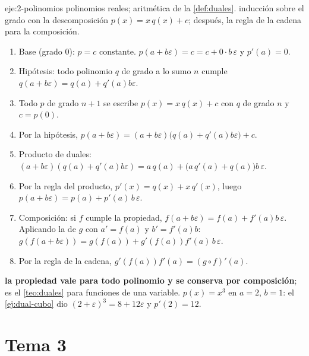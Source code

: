 \begin{solucion}{eje:2-polinomios}
\datos polinomios reales; aritmética de la \cref{def:duales}.
\planteamiento inducción sobre el grado con la descomposición $p(x)=x\,q(x)+c$; después, la regla de la cadena para la composición.
\pasos
\begin{enumerate}[label=\arabic*.]
  \item Base (grado 0): $p=c$ constante. $p(a+b\varepsilon)=c=c+0\cdot b\,\varepsilon$ y $p'(a)=0$.
  \item Hipótesis: todo polinomio $q$ de grado a lo sumo $n$ cumple $q(a+b\varepsilon)=q(a)+q'(a)b\varepsilon$.
  \item Todo $p$ de grado $n+1$ se escribe $p(x)=x\,q(x)+c$ con $q$ de grado $n$ y $c=p(0)$.
  \item Por la hipótesis, $p(a+b\varepsilon)=(a+b\varepsilon)\bigl(q(a)+q'(a)b\varepsilon\bigr)+c$.
  \item Producto de duales: $(a+b\varepsilon)(q(a)+q'(a)b\varepsilon)=a\,q(a)+\bigl(a\,q'(a)+q(a)\bigr)b\,\varepsilon$.
  \item Por la regla del producto, $p'(x)=q(x)+x\,q'(x)$, luego $p(a+b\varepsilon)=p(a)+p'(a)\,b\,\varepsilon$.
  \item Composición: si $f$ cumple la propiedad, $f(a+b\varepsilon)=f(a)+f'(a)b\,\varepsilon$. Aplicando la de $g$ con $a'=f(a)$ y $b'=f'(a)b$: $g(f(a+b\varepsilon))=g(f(a))+g'(f(a))f'(a)\,b\,\varepsilon$.
  \item Por la regla de la cadena, $g'(f(a))f'(a)=(g\circ f)'(a)$.
\end{enumerate}
\resultado \textbf{la propiedad vale para todo polinomio y se conserva por composición}; es el \cref{teo:duales} para funciones de una variable.
\comprobacion $p(x)=x^{3}$ en $a=2$, $b=1$: el \cref{ej:dual-cubo} dio $(2+\varepsilon)^{3}=8+12\varepsilon$ y $p'(2)=12$.
\end{solucion}

\section{Tema 3}

